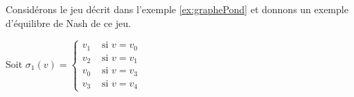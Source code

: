 
\begin{exemple}
	Considérons le jeu décrit dans l'exemple \ref{ex:graphePond} et donnons un exemple d'équilibre de Nash de ce jeu.\\
	
	 \begin{minipage}[c]{0.4\linewidth}Soit $\sigma _{1}(v) =\begin{cases}
						 v_{1} & \text{ si } v = v_{0}\\
						 v_{2} & \text{ si } v = v_{1}\\
						 v_{0} & \text{ si } v = v_{3}\\
						v_{3} & \text{ si } v = v_4
						\end{cases}$ \end{minipage} \hfill
	\begin{minipage}[c]{0.1\linewidth}\end{minipage} \hfill \begin{minipage}[c]{0.30\linewidth}	 \end{minipage} \newline
		

\end{exemple}
